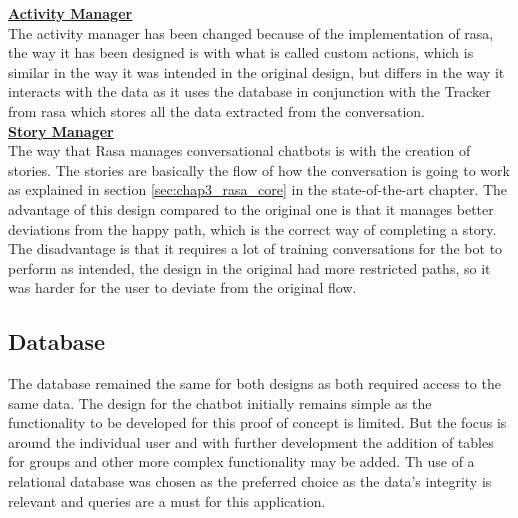 \textbf{\underline{Activity Manager}}\label{sec:chap4_fin_act}\\

The activity manager has been changed because of the implementation of rasa, the way it has been designed is with what is called custom actions, which is similar in the way it was intended in the original design, but differs in the way it interacts with the data as it uses the database in conjunction with the Tracker from rasa which stores all the data extracted from the conversation.\\

\textbf{\underline{Story Manager}}\label{sec:chap4_fin_stor}\\

The way that Rasa manages conversational chatbots is with the creation of stories. The stories are basically the flow of how the conversation is going to work as explained in section \ref{sec:chap3_rasa_core} in the state-of-the-art chapter. The advantage of this design compared to the original one is that it manages better deviations from the happy path, which is the correct way of completing a story. The disadvantage is that it requires a lot of training conversations for the bot to perform as intended, the design in the original had more restricted paths, so it was harder for the user to deviate from the original flow.

\subsection{Database}\label{sec:chap4_database}

The database remained the same for both designs as both required access to the same data. The design for the chatbot initially remains simple as the functionality to be developed for this proof of concept is limited. But the focus is around the individual user and with further development the addition of tables for groups and other more complex functionality may be added. Th use of a relational database was chosen as the preferred choice as the data’s integrity is relevant and queries are a must for this application.

